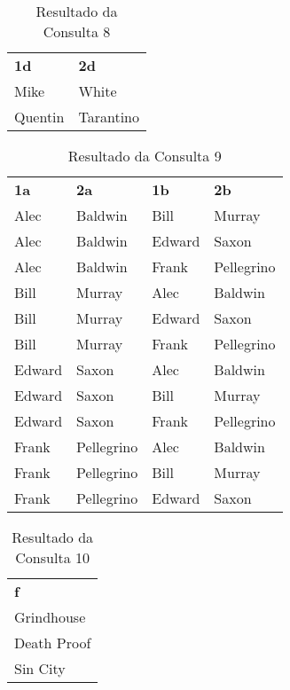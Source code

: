 \documentclass{article}
\begin{document}
\begin{table}[htbp]
\begin{center}
\begin{tabular}{ll}

\textbf{1d} & \textbf{2d} \\ 
Mike & White \\ 
Quentin & Tarantino  \\ 
\end{tabular}
\end{center}
\caption{Resultado da Consulta 8}
\label{}
\end{table}

\begin{table}[htbp]
\begin{center}
\begin{tabular}{llll}

\textbf{1a} & \textbf{2a} & \textbf{1b} & \textbf{2b} \\ 
Alec & Baldwin & Bill & Murray \\ 
Alec & Baldwin & Edward & Saxon \\ 
Alec & Baldwin & Frank & Pellegrino \\ 
Bill & Murray & Alec & Baldwin \\ 
Bill & Murray & Edward & Saxon \\ 
Bill & Murray & Frank & Pellegrino \\ 
Edward & Saxon & Alec & Baldwin \\ 
Edward & Saxon & Bill & Murray \\ 
Edward & Saxon & Frank & Pellegrino \\ 
Frank & Pellegrino & Alec & Baldwin \\ 
Frank & Pellegrino & Bill & Murray \\ 
Frank & Pellegrino & Edward & Saxon \\ 
\end{tabular}
\end{center}
\caption{Resultado da Consulta 9}
\label{}
\end{table}

\begin{table}[htbp]
\begin{center}
\begin{tabular}{l}

\textbf{f} \\ 
Grindhouse \\ 
Death Proof \\ 
Sin City \\ 
\end{tabular}
\end{center}
\caption{Resultado da Consulta 10}
\label{}
\end{table}

\end{document}

